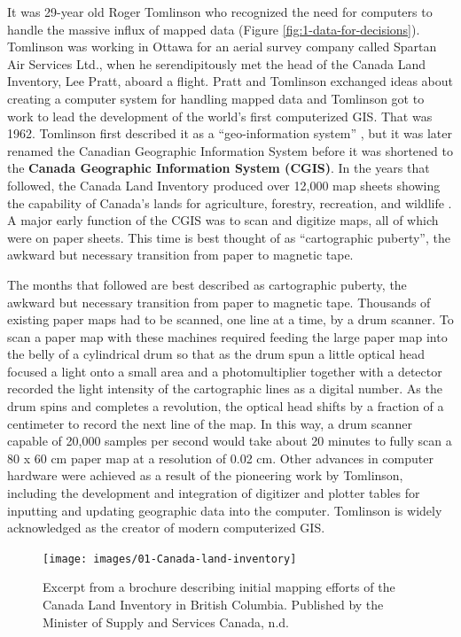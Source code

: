 \documentclass[
]{book}
\begin{document}
It was 29-year old Roger Tomlinson who recognized the need for computers to handle the massive influx of mapped data (Figure \ref{fig:1-data-for-decisions}). Tomlinson was working in Ottawa for an aerial survey company called Spartan Air Services Ltd., when he serendipitously met the head of the Canada Land Inventory, Lee Pratt, aboard a flight. Pratt and Tomlinson exchanged ideas about creating a computer system for handling mapped data and Tomlinson got to work to lead the development of the world's first computerized GIS. That was 1962. Tomlinson first described it as a ``geo-information system'' \citep{Tomlinson_1967}, but it was later renamed the Canadian Geographic Information System before it was shortened to the \textbf{Canada Geographic Information System (CGIS)}. In the years that followed, the Canada Land Inventory produced over 12,000 map sheets showing the capability of Canada's lands for agriculture, forestry, recreation, and wildlife \citep{fisher_overview_1979}. A major early function of the CGIS was to scan and digitize maps, all of which were on paper sheets. This time is best thought of as ``cartographic puberty'', the awkward but necessary transition from paper to magnetic tape.

The months that followed are best described as cartographic puberty, the awkward but necessary transition from paper to magnetic tape. Thousands of existing paper maps had to be scanned, one line at a time, by a drum scanner. To scan a paper map with these machines required feeding the large paper map into the belly of a cylindrical drum so that as the drum spun a little optical head focused a light onto a small area and a photomultiplier together with a detector recorded the light intensity of the cartographic lines as a digital number. As the drum spins and completes a revolution, the optical head shifts by a fraction of a centimeter to record the next line of the map. In this way, a drum scanner capable of 20,000 samples per second would take about 20 minutes to fully scan a 80 x 60 cm paper map at a resolution of 0.02 cm. Other advances in computer hardware were achieved as a result of the pioneering work by Tomlinson, including the development and integration of digitizer and plotter tables for inputting and updating geographic data into the computer. Tomlinson is widely acknowledged as the creator of modern computerized GIS.

\begin{figure}
\texttt{[image: images/01-Canada-land-inventory]} \caption{Excerpt from a brochure describing initial mapping efforts of the Canada Land Inventory in British Columbia. Published by the Minister of Supply and Services Canada, n.d.}\label{fig:1-Canada-land-inventory}
\end{figure}
\end{document}
